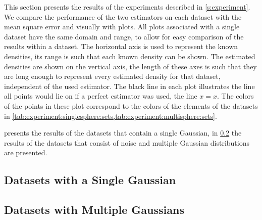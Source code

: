 

This section presents the results of the experiments described in \cref{s:experiment}. 
We compare the performance of the two estimators on each dataset with the mean square error and visually with plots. 
	All plots associated with a single dataset have the same domain and range, to allow for easy comparison of the results within a dataset. The horizontal axis is used to represent the known densities, its range is such that each known density can be shown. The estimated densities are shown on the vertical axis, the length of these axes is such that they are long enough to represent every estimated density for that dataset, independent of the used estimator. 
	The black line in each plot illustrates the line all points would lie on if a perfect estimator was used, \ie the line $x = x$.
	The colors of the points in these plot correspond to the colors of the elements of the datasets in \cref{tab:experiment:singlesphere:sets,tab:experiment:multisphere:sets}.

	 presents the results of the datasets that contain a single Gaussian, in \cref{s:results:multipleGaussian} the results of the datasets that consist of noise and multiple Gaussian distributions are presented. 

\subsection{Datasets with a Single Gaussian}
\label{s:results:singleGaussian}


\subsection{Datasets with Multiple Gaussians}
\label{s:results:multipleGaussian}
